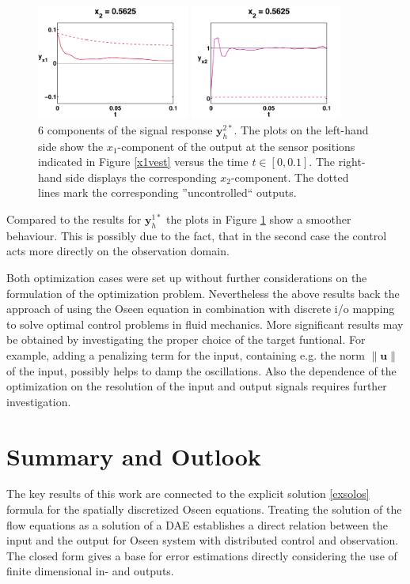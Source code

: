 \documentclass[a4paper,10pt,BCOR=15mm]{scrbook}
\providecommand{\norm}[1]{\lVert#1 \rVert}
\begin{document}
\begin{figure}
\begin{minipage}[b]{5cm}
    \includegraphics[width=5cm]{pics/fullOpti/new/x2_sigx2_3.pdf}  
  \end{minipage}
 \begin{minipage}[b]{5cm}
    \includegraphics[width=5cm]{pics/fullOpti/new/x2_sigx22_3.pdf}  
  \end{minipage}
   \caption{6 components of the signal response $\mathbf y_h^{2*}$. The plots on the left-hand side show the $x_1$-component of the output at the sensor positions indicated in Figure \ref{x1vest} versus the time $t\in [0,0.1]$. The right-hand side displays the corresponding $x_2$-component. The dotted lines mark the corresponding ''uncontrolled`` outputs.} 
\label{x2res}
\end{figure}

Compared to the results for $\mathbf y_h^{1*}$ the plots in Figure \ref{x2res} show a smoother behaviour. This is possibly due to the fact, that in the second case the control acts more directly on the observation domain. 

Both optimization cases were set up without further considerations on the formulation of the optimization problem. Nevertheless the above results back the approach of using the Oseen equation in combination with discrete i/o mapping to solve optimal control problems in fluid mechanics. More significant results may be obtained by investigating the proper choice of the target funtional. For example, adding a penalizing term for the input, containing e.g. the norm $\norm {\mathbf u}$ of the input, possibly helps to damp the oscillations. Also the dependence of the optimization on the resolution of the input and output signals requires further investigation.


\chapter{Summary and Outlook}
The key results of this work are connected to the explicit solution \eqref{exsolos} formula for the spatially discretized Oseen equations. Treating the solution of the flow equations as a solution of a DAE establishes a direct relation between the input and the output for Oseen system with distributed control and observation. The closed form gives a base for error estimations directly considering the use of finite dimensional in- and outputs.
\end{document}
